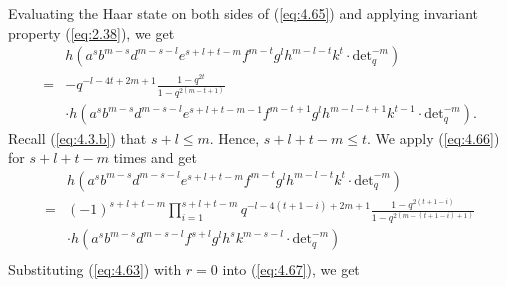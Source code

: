 \documentclass[table,a4paper,reqno]{amsart}
\numberwithin{equation}{section}
\theoremstyle{definition}
\begin{document}
Evaluating the Haar state on both sides of (\ref{eq:4.65}) and applying invariant property (\ref{eq:2.38}), we get
\begin{equation}\label{eq:4.66}
    \begin{split}
        &h\left(a^{s}b^{m-s}d^{m-s-l}e^{s+l+t-m}f^{m-t}g^{l}h^{m-l-t}k^{t}\cdot\text{det}_q^{-m}\right)\\
        =&-q^{-l-4t+2m+1}\frac{1-q^{2t}}{1-q^{2(m-t+1)}}\\
        &\cdot h\left(a^{s}b^{m-s}d^{m-s-l}e^{s+l+t-m-1}f^{m-t+1}g^{l}h^{m-l-t+1}k^{t-1}\cdot\text{det}_q^{-m}\right).
    \end{split}
\end{equation}
Recall (\ref{eq:4.3.b}) that $s+l\le m$. Hence, $s+l+t-m\le t$. We apply (\ref{eq:4.66}) for $s+l+t-m$ times and get
\begin{equation}\label{eq:4.67}
    \begin{split}
        &h\left(a^{s}b^{m-s}d^{m-s-l}e^{s+l+t-m}f^{m-t}g^{l}h^{m-l-t}k^{t}\cdot\text{det}_q^{-m}\right)\\
        =&(-1)^{s+l+t-m}\prod_{i=1}^{s+l+t-m} q^{-l-4(t+1-i)+2m+1}\frac{1-q^{2(t+1-i)}}{1-q^{2(m-(t+1-i)+1)}}\\
        &\cdot h\left(a^{s}b^{m-s}d^{m-s-l}f^{s+l}g^{l}h^{s}k^{m-s-l}\cdot\text{det}_q^{-m}\right)\\
    \end{split}
\end{equation}
Substituting (\ref{eq:4.63}) with $r=0$ into (\ref{eq:4.67}), we get
\end{document}
